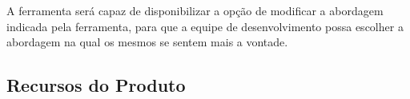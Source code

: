 A ferramenta será capaz de disponibilizar a opção de modificar a abordagem indicada pela ferramenta, para que a equipe de desenvolvimento possa escolher a abordagem na qual os mesmos se sentem mais a vontade.

\subsection{Recursos do Produto}

